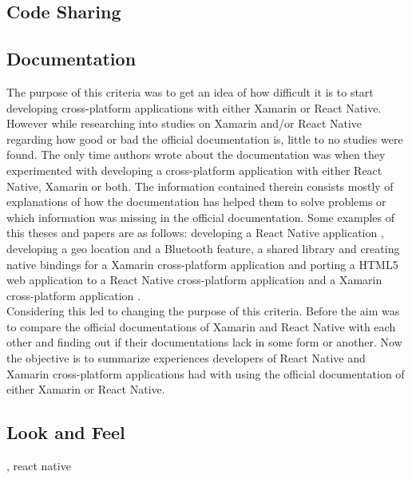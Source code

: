 \documentclass[Bachelor,BIF,english]{twbook}
\begin{document}
\subsection{Code Sharing}
\cite[p.~31]{Hansson_Vidhall_2016}

\subsection{Documentation}
The purpose of this criteria was to get an idea of how difficult it is to start developing cross-platform applications with either Xamarin or React Native. However while researching into studies on Xamarin and/or React Native regarding how good or bad the official documentation is, little to no studies were found. The only time authors wrote about the documentation was when they experimented with developing a cross-platform application with either React Native, Xamarin or both. The information contained therein consists mostly of explanations of how the documentation has helped them to solve problems or which information was missing in the official documentation. Some examples of this theses and papers are as follows: developing a React Native application \cite[p.~16-18]{Danielsson_2016}, developing a geo location and a Bluetooth feature, a shared library and creating native bindings for a Xamarin cross-platform application \cite[p.~10-15]{Dickson_2013} and porting a HTML5 web application to a React Native cross-platform application and a Xamarin cross-platform application \cite[p.~33-69]{ZubaBernhard2017EdPb}.
\\[\baselineskip]
Considering this led to changing the purpose of this criteria. Before the aim was to compare the official documentations of Xamarin and React Native with each other and finding out if their documentations lack in some form or another. Now the objective is to summarize experiences developers of React Native and Xamarin cross-platform applications had with using the official documentation of either Xamarin or React Native. 

\subsection{Look and Feel}
\cite[p.~18]{GaouarBenamarBendimerad2016}, react native \cite[p.~25]{Danielsson_2016} \cite[p.~31]{Hansson_Vidhall_2016}
\end{document}
